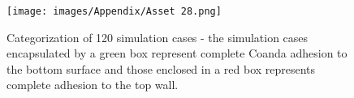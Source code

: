\appendix
\label{appendix}
\begin{figure}[ht]
    \centering
    \texttt{[image: images/Appendix/Asset 28.png]}
    \caption{Categorization of 120 simulation cases - the simulation cases encapsulated by a green box represent complete Coanda adhesion to the bottom surface and those enclosed in a red box represents complete adhesion to the top wall.}
    \label{tsne}
    \end{figure}